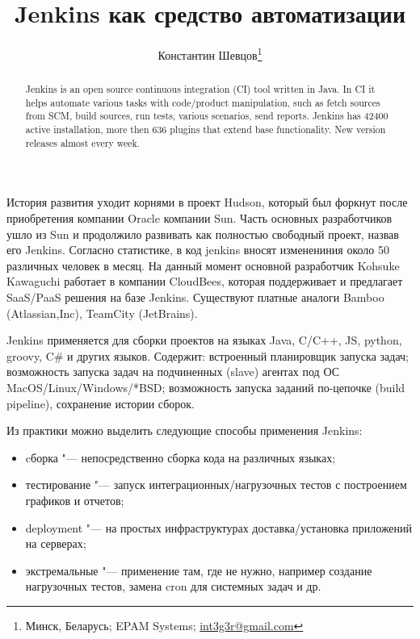 \documentclass[10pt, a5paper]{article}
\begin{document}
\title{Jenkins как средство автоматизации}%

\author{Константин Шевцов\footnote{Минск, Беларусь; EPAM Systems; \url{int3g3r@gmail.com}}}
\maketitle

\begin{abstract}
Jenkins is an open source continuous integration (CI) tool written in Java. In CI it helps automate various tasks with code/product manipulation, such as fetch sources from SCM, build sources, run tests, various scenarios, send reports. Jenkins has 42400 active installation, more then 636 plugins that extend base functionality. New version releases almost every week.
\end{abstract}

История развития уходит корнями в проект Hudson, который был форкнут после приобретения компании Oracle компании Sun. Часть основных разработчиков ушло из Sun и продолжило развивать как полностью свободный проект, назвав его Jenkins. Согласно статистике, в код jenkins вносят изменениния около 50 различных человек в месяц. На данный момент основной разработчик Kohsuke Kawaguchi работает в компании CloudBees, которая поддерживает и предлагает SaaS/PaaS решения на базе Jenkins. Существуют платные аналоги Bamboo (Atlassian,Inc), TeamCity (JetBrains).



Jenkins применяется для сборки проектов на языках Java, C/C++, JS, python, groovy, C\# и других языков. Содержит: встроенный планировщик запуска задач; возможность запуска задач на подчиненных (slave) агентах под ОС MacOS/Linux/Windows/*BSD; возможность запуска заданий по-цепочке (build pipeline), сохранение истории сборок.

Из практики можно выделить следующие способы применения Jenkins:

\begin{itemize}
  \item cборка "--- непосредственно сборка кода на различных языках;
  \item тестирование "--- запуск интеграционных/нагрузочных тестов с построением графиков и отчетов;
  \item deployment "--- на простых инфраструктурах доставка/установка приложений на серверах;
  \item экстремальные "--- применение там, где не нужно, например создание нагрузочных тестов, замена cron для системных задач и др.
\end{itemize}
\end{document}
